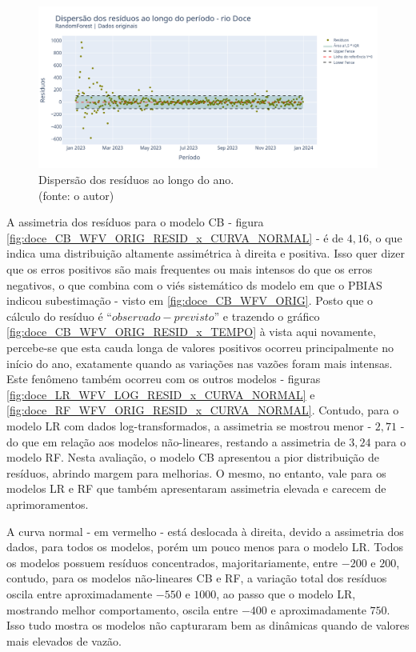 \begin{figure}[!h]
	\centering
	\includegraphics[scale=0.33]{Figuras/rio_doce/wfv/RF/RF_WFV_ORIG_RESID_x_TEMPO.png}
	\caption{Dispersão dos resíduos ao longo do ano.\\(fonte: o autor)}
	\label{fig:doce_RF_WFV_ORIG_RESID_x_TEMPO}
\end{figure}
\clearpage

A assimetria dos resíduos para o modelo CB - figura \ref{fig:doce_CB_WFV_ORIG_RESID_x_CURVA_NORMAL} - é de $4,16$, o que indica uma distribuição altamente assimétrica à direita e positiva. Isso quer dizer que os erros positivos são mais frequentes ou mais intensos do que os erros negativos, o que combina com o viés sistemático ds modelo em que o PBIAS indicou subestimação - visto em \ref{fig:doce_CB_WFV_ORIG}. Posto que o cálculo do resíduo é ``$observado - previsto$'' e trazendo o gráfico \ref{fig:doce_CB_WFV_ORIG_RESID_x_TEMPO} à vista aqui novamente, percebe-se que esta cauda longa de valores positivos ocorreu principalmente no início do ano, exatamente quando as variações nas vazões foram mais intensas. Este fenômeno também ocorreu com os outros modelos - figuras \ref{fig:doce_LR_WFV_LOG_RESID_x_CURVA_NORMAL} e \ref{fig:doce_RF_WFV_ORIG_RESID_x_CURVA_NORMAL}. Contudo, para o modelo LR com dados log-transformados, a assimetria se mostrou menor - $2,71$ - do que em relação aos modelos não-lineares, restando a assimetria de $3,24$ para o modelo RF. Nesta avaliação, o modelo CB apresentou a pior distribuição de resíduos, abrindo margem para melhorias. O mesmo, no entanto, vale para os modelos LR e RF que também apresentaram assimetria elevada e carecem de aprimoramentos.

A curva normal - em vermelho - está deslocada à direita, devido a assimetria dos dados, para todos os modelos, porém um pouco menos para o modelo LR. Todos os modelos possuem resíduos concentrados, majoritariamente, entre $-200$ e $200$, contudo, para os modelos não-lineares CB e RF, a variação total dos resíduos oscila entre aproximadamente $-550$ e $1000$, ao passo que o modelo LR, mostrando melhor comportamento, oscila entre $-400$ e aproximadamente $750$. Isso tudo mostra os modelos não capturaram bem as dinâmicas quando de valores mais elevados de vazão.

